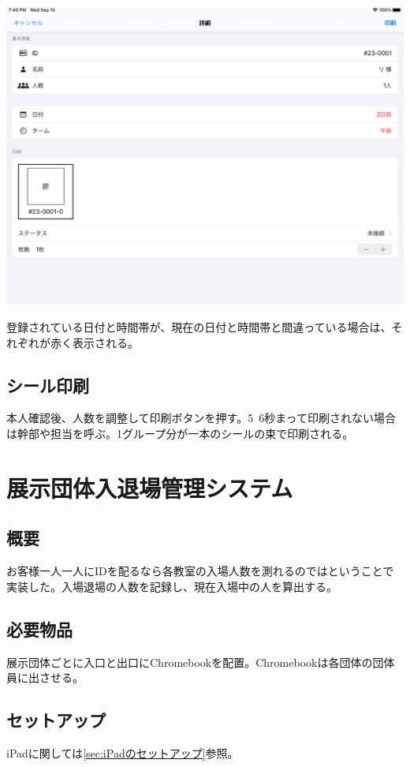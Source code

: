 \documentclass[dvipdfmx,jb5]{jarticle}
\begin{document}
\begin{enumerate}
   \includegraphics[scale=0.2]{assets/entrance-system.png}
 \end{enumerate}
    登録されている日付と時間帯が、現在の日付と時間帯と間違っている場合は、それぞれが赤く表示される。
 \subsection{シール印刷}
 本人確認後、人数を調整して印刷ボタンを押す。5~6秒まって印刷されない場合は幹部や担当を呼ぶ。1グループ分が一本のシールの束で印刷される。
\section{展示団体入退場管理システム}
\subsection{概要}
お客様一人一人にIDを配るなら各教室の入場人数を測れるのではということで実装した。入場退場の人数を記録し、現在入場中の人を算出する。
\subsection{必要物品}
展示団体ごとに入口と出口にChromebookを配置。Chromebookは各団体の団体員に出させる。
\subsection{セットアップ}
iPadに関しては\ref{sec:iPadのセットアップ}参照。\\
\end{document}
